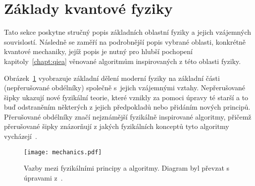 \section{Základy kvantové fyziky}
Tato sekce poskytne stručný popis základních oblastní fyziky a jejich vzájemných souvislostí. 
Následně se zaměří na podrobnější popis vybrané oblasti, konkrétně kvantové mechaniky, jejíž popis je nutný pro hlubší pochopení kapitoly~\ref{chapt:qiea} věnované algoritmům inspirovaných z této oblasti fyziky.

Obrázek~\ref{fig:mechanics} vyobrazuje základní dělení moderní fyziky na základní části (nepřerušované obdélníky) společně s~jejich vzájemnými vztahy. 
Nepřerušované šipky ukazují nové fyzikální teorie, které vznikly za pomoci úpravy té starší a to buď odstraněním některých z jejich předpokladů nebo přidáním nových principů.
Přerušované obdélníky značí nejznámější fyzikálně inspirované algoritmy, přičemž přerušované šipky znázorňují z jakých fyzikálních konceptů tyto algoritmy vycházejí~\cite{NaturalComputing}.

\begin{figure}[ht!]
    \centering
    \texttt{[image: mechanics.pdf]}
    \caption{Vazby mezi fyzikálními principy a algoritmy. Diagram byl převzat s úpravami z~\cite{NaturalComputing}.}
    \label{fig:mechanics}
\end{figure}

